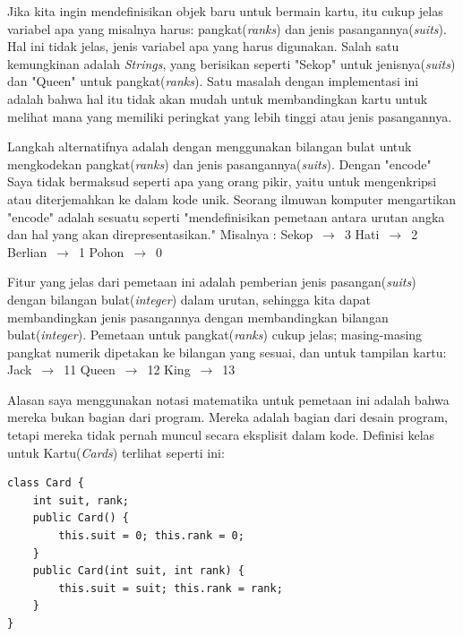\documentclass[12pt,b5paper,openright,twoside]{book}
\begin{document}
\noindent Jika kita ingin mendefinisikan objek baru untuk bermain kartu, itu cukup jelas variabel apa yang misalnya harus: pangkat(\textit{ranks}) dan jenis pasangannya(\textit{suits}). Hal ini tidak jelas, jenis variabel apa yang harus digunakan. Salah satu kemungkinan adalah \textit{Strings}, yang berisikan seperti "Sekop" untuk jenisnya(\textit{suits}) dan "Queen" untuk pangkat(\textit{ranks}). Satu masalah dengan implementasi ini adalah bahwa hal itu tidak akan mudah untuk membandingkan kartu untuk melihat mana yang memiliki peringkat yang lebih tinggi atau jenis pasangannya.

\noindent Langkah alternatifnya adalah dengan menggunakan bilangan bulat untuk mengkodekan pangkat(\textit{ranks}) dan jenis pasangannya({\textit{suits}}). Dengan "encode" Saya tidak bermaksud seperti apa yang orang pikir, yaitu untuk mengenkripsi atau diterjemahkan ke dalam kode unik. Seorang ilmuwan komputer mengartikan "encode" adalah sesuatu seperti "mendefinisikan pemetaan antara urutan angka dan hal yang akan direpresentasikan." Misalnya :
\noindent 
\newline Sekop $\,\to\,$ 3 
\newline Hati $\,\to\,$ 2 
\newline Berlian  $\,\to\,$ 1 
\newline Pohon $\,\to\,$ 0 \par

\noindent Fitur yang jelas dari pemetaan ini adalah pemberian jenis pasangan(\textit{suits}) dengan bilangan bulat(\textit{integer}) dalam urutan, sehingga kita dapat membandingkan jenis pasangannya dengan membandingkan bilangan bulat(\textit{integer}). Pemetaan untuk pangkat(\textit{ranks}) cukup jelas; masing-masing pangkat numerik dipetakan ke bilangan yang sesuai, dan untuk tampilan kartu: 
\noindent 
\newline Jack $\,\to\,$ 11 
\newline Queen $\,\to\,$ 12 
\newline King  $\,\to\,$ 13 \par

\noindent Alasan saya menggunakan notasi matematika untuk pemetaan ini adalah bahwa mereka bukan bagian dari program. Mereka adalah bagian dari desain program, tetapi mereka tidak pernah muncul secara eksplisit dalam kode. Definisi kelas untuk Kartu(\textit{Cards}) terlihat seperti ini:

\begin{lstlisting}
class Card { 
    int suit, rank;
    public Card() { 
        this.suit = 0; this.rank = 0; 
    }
    public Card(int suit, int rank) { 
        this.suit = suit; this.rank = rank; 
    }
}

\end{lstlisting} \par 
\end{document}
